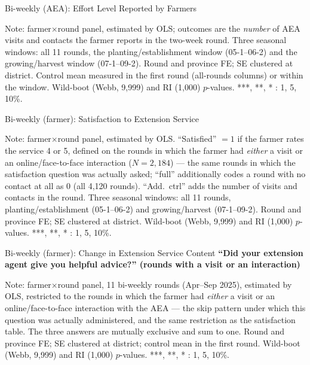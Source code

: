 \documentclass[aspectratio=169]{beamer}
\newcommand{\notefont}{\fontsize{5pt}{6pt}\selectfont}
\begin{document}
\begin{frame}{Bi-weekly (AEA): Effort Level Reported by Farmers}
	\centering
	\begin{minipage}{0.94\textwidth}
		\notefont
		Note: farmer$\times$round panel, estimated by OLS; outcomes are the \emph{number} of AEA
		visits and contacts the farmer reports in the two-week round. Three seasonal windows: all 11 rounds, the
		planting/establishment window (05-1--06-2) and the growing/harvest window (07-1--09-2).
		Round and province FE; SE clustered at district. Control mean measured in the first round
		(all-rounds columns) or within the window. Wild-boot (Webb, 9{,}999) and RI (1{,}000)
		$p$-values. ***, **, * : 1, 5, 10\%.
	\end{minipage}
\end{frame}

\begin{frame}{Bi-weekly (farmer): Satisfaction to Extension Service}
	\centering
	\begin{minipage}{0.94\textwidth}
		\notefont
		Note: farmer$\times$round panel, estimated by OLS. ``Satisfied'' $=1$ if the farmer rates
		the service 4 or 5, defined on the rounds in which the farmer had \emph{either} a visit or
		an online/face-to-face interaction ($N=2{,}184$) --- the same rounds in which the
		satisfaction question was actually asked; ``full'' additionally codes a round with no
		contact at all as 0 (all 4{,}120 rounds). ``Add.\ ctrl'' adds the number of visits and
		contacts in the round. Three seasonal
		windows: all 11 rounds, planting/establishment (05-1--06-2) and growing/harvest
		(07-1--09-2). Round and province FE; SE clustered at district. Wild-boot (Webb, 9{,}999)
		and RI (1{,}000) $p$-values. ***, **, * : 1, 5, 10\%.
	\end{minipage}
\end{frame}

\begin{frame}{Bi-weekly (farmer): Change in Extension Service Content}
	\centering
	{\small\textbf{``Did your extension agent give you helpful advice?'' (rounds with a visit or an interaction)}}\\[3pt]
	\begin{minipage}{0.94\textwidth}
		\notefont
		Note: farmer$\times$round panel, 11 bi-weekly rounds (Apr--Sep 2025), estimated by OLS,
		restricted to the rounds in which the farmer had \emph{either} a visit or an
		online/face-to-face interaction with the AEA --- the skip pattern under which this
		question was actually administered, and the same restriction as the satisfaction table.
		The three answers are mutually exclusive and sum to one.
		Round and province FE; SE clustered at district; control mean in the first
		round. Wild-boot (Webb, 9{,}999) and RI (1{,}000) $p$-values.
		***, **, * : 1, 5, 10\%.
	\end{minipage}
\end{frame}
\end{document}
